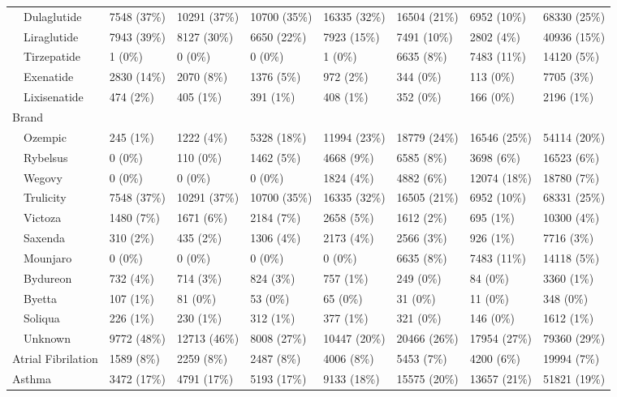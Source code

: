 \begin{longtable}{p{}p{}p{}p{}p{}p{}p{}p{}}
    Dulaglutide & 7548 (37\%) & 10291 (37\%) & 10700 (35\%) & 16335 (32\%) & 16504 (21\%) & 6952 (10\%) & 68330 (25\%) \\ 
    Liraglutide & 7943 (39\%) & 8127 (30\%) & 6650 (22\%) & 7923 (15\%) & 7491 (10\%) & 2802 (4\%) & 40936 (15\%) \\ 
    Tirzepatide & 1 (0\%) & 0 (0\%) & 0 (0\%) & 1 (0\%) & 6635 (8\%) & 7483 (11\%) & 14120 (5\%) \\ 
    Exenatide & 2830 (14\%) & 2070 (8\%) & 1376 (5\%) & 972 (2\%) & 344 (0\%) & 113 (0\%) & 7705 (3\%) \\ 
    Lixisenatide & 474 (2\%) & 405 (1\%) & 391 (1\%) & 408 (1\%) & 352 (0\%) & 166 (0\%) & 2196 (1\%) \\ 
  Brand &  &  &  &  &  &  &  \\ 
    Ozempic & 245 (1\%) & 1222 (4\%) & 5328 (18\%) & 11994 (23\%) & 18779 (24\%) & 16546 (25\%) & 54114 (20\%) \\ 
    Rybelsus & 0 (0\%) & 110 (0\%) & 1462 (5\%) & 4668 (9\%) & 6585 (8\%) & 3698 (6\%) & 16523 (6\%) \\ 
    Wegovy & 0 (0\%) & 0 (0\%) & 0 (0\%) & 1824 (4\%) & 4882 (6\%) & 12074 (18\%) & 18780 (7\%) \\ 
    Trulicity & 7548 (37\%) & 10291 (37\%) & 10700 (35\%) & 16335 (32\%) & 16505 (21\%) & 6952 (10\%) & 68331 (25\%) \\ 
    Victoza & 1480 (7\%) & 1671 (6\%) & 2184 (7\%) & 2658 (5\%) & 1612 (2\%) & 695 (1\%) & 10300 (4\%) \\ 
    Saxenda & 310 (2\%) & 435 (2\%) & 1306 (4\%) & 2173 (4\%) & 2566 (3\%) & 926 (1\%) & 7716 (3\%) \\ 
    Mounjaro & 0 (0\%) & 0 (0\%) & 0 (0\%) & 0 (0\%) & 6635 (8\%) & 7483 (11\%) & 14118 (5\%) \\ 
    Bydureon & 732 (4\%) & 714 (3\%) & 824 (3\%) & 757 (1\%) & 249 (0\%) & 84 (0\%) & 3360 (1\%) \\ 
    Byetta & 107 (1\%) & 81 (0\%) & 53 (0\%) & 65 (0\%) & 31 (0\%) & 11 (0\%) & 348 (0\%) \\ 
    Soliqua & 226 (1\%) & 230 (1\%) & 312 (1\%) & 377 (1\%) & 321 (0\%) & 146 (0\%) & 1612 (1\%) \\ 
    Unknown & 9772 (48\%) & 12713 (46\%) & 8008 (27\%) & 10447 (20\%) & 20466 (26\%) & 17954 (27\%) & 79360 (29\%) \\ 
  Atrial Fibrilation & 1589 (8\%) & 2259 (8\%) & 2487 (8\%) & 4006 (8\%) & 5453 (7\%) & 4200 (6\%) & 19994 (7\%) \\ 
  Asthma & 3472 (17\%) & 4791 (17\%) & 5193 (17\%) & 9133 (18\%) & 15575 (20\%) & 13657 (21\%) & 51821 (19\%) \\ 

\end{longtable}
